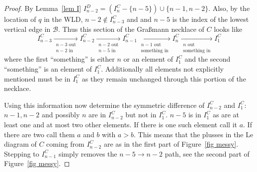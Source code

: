 \documentclass[11pt]{article}
\theoremstyle{remark}
\theoremstyle{definition}
\begin{document}
\begin{proof}
  By Lemma~\ref{lem I} $I_{n-2}^{D}= (I_{n}^{C} - \{n-5\})\cup \{n-1,n-2\}$.  Also, by the location of $q$ in the WLD,  $n-2\not\in I_{n-3}^{C}$ and and $n-5$ is the index of the lowest vertical edge in $\mathcal{B}$.  Thus this section of the Gra\ss mann necklace of $C$ looks like
  \begin{equation}\label{eq necklace}
  I_{n-3}^{C} \underset{\substack{n-3\text{ out}\\n-2\text{ in}}}{\rightarrow} I_{n-2}^{C} \underset{\substack{n-2\text{ out}\\n-5\text{ in}}}{\rightarrow} I_{n-1}^{C} \underset{\substack{n-1\text{ out}\\\text{something in}}}{\rightarrow} I_{n}^{C} \underset{\substack{n \text{ out}\\\text{something in}}}{\rightarrow} I_1^{C}
  \end{equation}
  where the first ``something'' is either $n$ or an element of $I_1^{C}$ and the second ``something'' is an element of $I_1^{C}$.  Additionally all elements not explicitly mentioned must be in $I_1^{C}$ as they remain unchanged through this portion of the necklace.

  Using this information now determine the symmetric difference of $I_{n-2}^{C}$ and $I_1^{C}$: $n-1, n-2$ and possibly $n$ are in $I_{n-2}^{C}$ but not in $I_1^{C}$.  $n-5$ is in $I_1^{C}$ as are at least one and at most two other elements.  If there is one such element call it $a$.  If there are two call them $a$ and $b$ with $a>b$.  This means that the plusses in the Le diagram of $C$ coming from $I_{n-2}^{C}$ are as in the first part of Figure~\ref{fig messy}.  Stepping to $I_{n-1}^{C}$ simply removes the $n-5\rightarrow n-2$ path, see the second part of Figure~\ref{fig messy}.


\end{proof}
\end{document}
